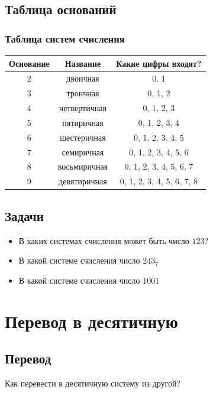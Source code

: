 \documentclass[compress,red]{beamer}
\begin{document}
\subsection{Таблица оснований}
\begin{frame}[fragile]
  \frametitle{Таблица систем счисления}
  \begin{tabular}{ccc}
    \hline
    \hline
    Основание & Название & Какие цифры входят? \\ 
    \hline
    \hline
    2 & двоичная & 0, 1 \\
    3 & троичная & 0, 1, 2 \\
    4 & четвертичная & 0, 1, 2, 3 \\
    5 & пятиричная & 0, 1, 2, 3, 4 \\
    6 & шестеричная & 0, 1, 2, 3, 4, 5 \\
    7 & семиричная & 0, 1, 2, 3, 4, 5, 6 \\
    8 & восьмиричная & 0, 1, 2, 3, 4, 5, 6, 7 \\
    9 & девятиричная & 0, 1, 2, 3, 4, 5, 6, 7, 8 \\
  \end{tabular}
\end{frame}

\subsection{Задачи}
\begin{frame}
  \begin{itemize}
    \item \Large{В каких системах счисления может быть число $123$?}
    \item \Large{В какой системе счисления число $243_7$}
    \item \Large{В какой системе счисления число $1001$}
  \end{itemize}
\end{frame}

\section{Перевод в десятичную}
\subsection{Перевод}
\begin{frame}
  \begin{center}
    \Huge{Как перевести в десятичную систему из другой?}
  \end{center}
\end{frame}
\end{document}
